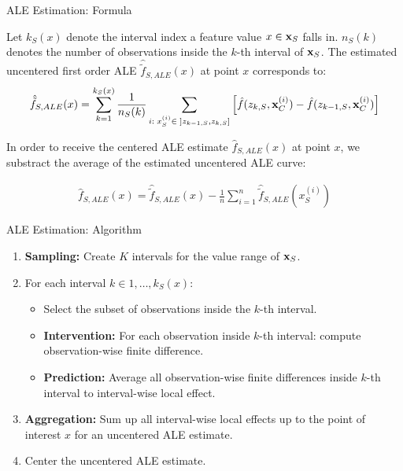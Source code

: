 \begin{vbframe}{ALE Estimation: Formula}

Let $k_S(x)$ denote the interval index a feature value $x \in \xv_S$ falls in. $n_S(k)$ denotes the number of observations inside the $k$-th interval of $\xv_S$. The estimated uncentered first order ALE $\hat{\tilde{f}}_{S, ALE}(x)$ at point $x$ corresponds to:
$$
\begin{aligned}
\hat{\tilde{f}}_{S, ALE}(x) = \sum_{k = 1}^{k_S(x)}\frac{1}{n_S(k)}\sum_{i: \; x_S^{(i)} \in \; ]z_{k-1, S}, z_{k, S}]}\left[\fh(z_{k, S}, \xi_C) -\fh(z_{k-1, S}, \xi_C)\right]
\end{aligned}
$$

In order to receive the centered ALE estimate $\hat{f}_{S, ALE}(x)$ at point $x$, we substract the average of the estimated uncentered ALE curve:

$$
\begin{aligned}
\hat{f}_{S, ALE}(x) = \hat{\tilde{f}}_{S, ALE}(x) - \frac{1}{n}\sum_{i = 1}^n \hat{\tilde{f}}_{S, ALE}(x_S^{(i)})
\end{aligned}
$$

\end{vbframe}

\begin{vbframe}{ALE Estimation: Algorithm}

\begin{enumerate}
	\item \textbf{Sampling:} Create $K$ intervals for the value range of $\xv_S$.
	 \lz
	\item For each interval $k \in 1, \dots, k_S(x)$:
	  \begin{itemize}
	  \item Select the subset of observations inside the $k$-th interval.
	  \item \textbf{Intervention:} For each observation inside $k$-th interval: compute observation-wise finite difference.
	  \item \textbf{Prediction:} Average all observation-wise finite differences inside $k$-th interval to interval-wise local effect.
	  \end{itemize}
	  \lz
  \item \textbf{Aggregation:} Sum up all interval-wise local effects up to the point of interest $x$ for an uncentered ALE estimate.
  \lz
  \item Center the uncentered ALE estimate.
\end{enumerate}

\end{vbframe}

